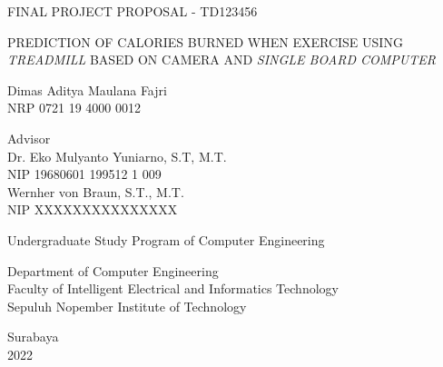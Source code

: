 \begin{large}
  FINAL PROJECT PROPOSAL - TD123456
\end{large}

\vspace{\fill}

\begin{spacing}{1.5}
  \begin{Large}
    PREDICTION OF CALORIES BURNED WHEN EXERCISE USING \emph{TREADMILL} BASED ON CAMERA AND \emph{SINGLE BOARD COMPUTER}
  \end{Large}
\end{spacing}

\vspace{\fill}

\begin{large}
  Dimas Aditya Maulana Fajri \\
  \textnormal{NRP 0721 19 4000 0012}
\end{large}

\vspace{\fill}

\begin{large}
  \textnormal{Advisor} \\
  Dr. Eko Mulyanto Yuniarno, S.T, M.T. \\
  \textnormal{NIP 19680601 199512 1 009} \\
  Wernher von Braun, S.T., M.T. \\
  \textnormal{NIP XXXXXXXXXXXXXXX}
\end{large}

\vspace{\fill}

Undergraduate Study Program of Computer Engineering \\

\normalfont

Department of Computer Engineering \\
Faculty of Intelligent Electrical and Informatics Technology \\
Sepuluh Nopember Institute of Technology

Surabaya \\
2022

